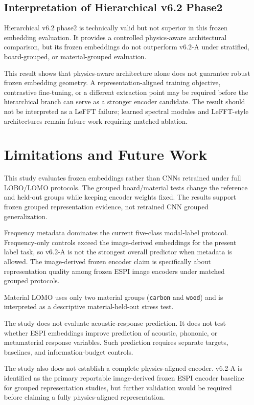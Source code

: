 \documentclass[review,3p,times]{elsarticle}
\begin{document}
\subsection{Interpretation of Hierarchical v6.2 Phase2}
Hierarchical v6.2 phase2 is technically valid but not superior in this frozen embedding evaluation. It provides a controlled physics-aware architectural comparison, but its frozen embeddings do not outperform v6.2-A under stratified, board-grouped, or material-grouped evaluation.

This result shows that physics-aware architecture alone does not guarantee robust frozen embedding geometry. A representation-aligned training objective, contrastive fine-tuning, or a different extraction point may be required before the hierarchical branch can serve as a stronger encoder candidate. The result should not be interpreted as a LeFFT failure; learned spectral modules and LeFFT-style architectures remain future work requiring matched ablation.

\section{Limitations and Future Work}
\label{sec:limitations}

This study evaluates frozen embeddings rather than CNNs retrained under full LOBO/LOMO protocols. The grouped board/material tests change the reference and held-out groups while keeping encoder weights fixed. The results support frozen grouped representation evidence, not retrained CNN grouped generalization.

Frequency metadata dominates the current five-class modal-label protocol. Frequency-only controls exceed the image-derived embeddings for the present label task, so v6.2-A is not the strongest overall predictor when metadata is allowed. The image-derived frozen encoder claim is specifically about representation quality among frozen ESPI image encoders under matched grouped protocols.

Material LOMO uses only two material groups (\texttt{carbon} and \texttt{wood}) and is interpreted as a descriptive material-held-out stress test.

The study does not evaluate acoustic-response prediction. It does not test whether ESPI embeddings improve prediction of acoustic, phononic, or metamaterial response variables. Such prediction requires separate targets, baselines, and information-budget controls.

The study also does not establish a complete physics-aligned encoder. v6.2-A is identified as the primary reportable image-derived frozen ESPI encoder baseline for grouped representation studies, but further validation would be required before claiming a fully physics-aligned representation.
\end{document}
